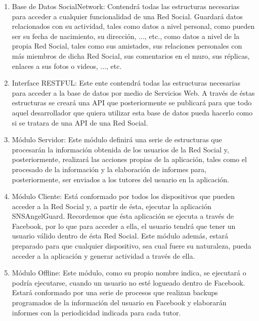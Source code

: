 \begin{enumerate}
\item Base de Datos SocialNetwork: Contendrá todas las estructuras necesarias para acceder a cualquier funcionalidad de una Red Social. Guardará datos relacionados con su actividad, tales como datos a nivel personal, como pueden ser su fecha de nacimiento, su dirección, ..., etc., como datos a nivel de la propia Red Social, tales como sus amistades, sus relaciones personales con más miembros de dicha Red Social, sus comentarios en el muro, sus réplicas, enlaces a sus fotos o videos, ..., etc.
\item Interface RESTFUL: Este ente contendrá todas las estructuras necesarias para acceder a la base de datos por medio de Servicios Web. A través de éstas estructuras se creará una API que posteriormente se publicará para que todo aquel desarrollador que quiera utilizar esta base de datos pueda hacerlo como si se tratara de una API de una Red Social.
\item Módulo Servidor: Este módulo definirá una serie de estructuras que procesarán la información obtenida de los usuarios de la Red Social y, posteriormente, realizará las acciones propias de la aplicación, tales como el procesado de la información y la elaboración de informes para, posteriormente, ser enviados a los tutores del usuario en la aplicación.
\item Módulo Cliente: Está conformado por todos los dispositivos que pueden acceder a la Red Social y, a partir de ésta, ejecutar la aplicación SNSAngelGuard. Recordemos que ésta aplicación se ejecuta a través de Facebook, por lo que para acceder a ella, el usuario tendrá que tener un usuario válido dentro de ésta Red Social. Este módulo además, estará preparado para que cualquier dispositivo, sea cual fuere su naturaleza, pueda acceder a la aplicación y generar actividad a través de ella.
\item Módulo Offline: Este módulo, como su propio nombre indica, se ejecutará o podría ejecutarse, cuando un usuario no esté logueado dentro de Facebook. Estará conformado por una serie de procesos que realizan backups programados de la información del usuario en Facebook y elaborarán informes con la periodicidad indicada para cada tutor.
\end{enumerate}



